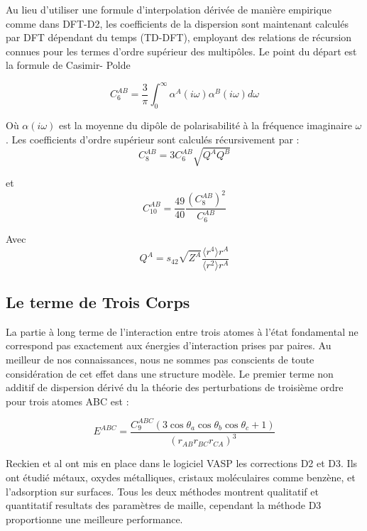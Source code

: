 	
	Au lieu d'utiliser une formule d'interpolation dérivée de manière empirique comme dans DFT-D2, les coefficients de la dispersion sont maintenant calculés par DFT dépendant du temps (TD-DFT), employant des relations de récursion connues pour les termes d'ordre supérieur des multipôles. Le point du départ est la formule de Casimir- Polde\cite{kaplan2006intermolecular} 
	
	\bigskip
	\begin{equation}
	C_{6}^{AB} = \frac{3}{\pi}\int_{0}^{\infty} \alpha^{A} (i\omega) \alpha^{B} (i\omega) d\omega
	\end{equation}
	\bigskip
	
	Où $\alpha(i\omega)$ est la moyenne du dipôle de polarisabilité à la fréquence imaginaire $\omega$. Les coefficients d'ordre supérieur sont calculés récursivement par :
	\bigskip
	\begin{equation}
	C_{8}^{AB} = 3C_{6}^{AB} \sqrt{Q^{A}Q^{B}}
	\end{equation}
	
	et \begin{equation}
	C_{10}^{AB} =\frac{49}{40} \frac{(C_{8}^{AB})^{2}}{C_{6}^{AB}}
	\end{equation}
	
	Avec
	\begin{equation}
	Q^{A} = s_{42}\sqrt{Z^{A}} \frac{\langle r^{4}\rangle r^{A}}{\langle r^{2}\rangle r^{A}}
	\end{equation}
	
	\bigskip
	\subsection{Le terme de Trois Corps}
	\bigskip
	
	La partie à long terme de l'interaction entre trois atomes à l'état fondamental ne correspond pas exactement aux énergies d'interaction prises par paires. Au meilleur de nos connaissances, nous ne sommes pas conscients de toute considération de cet effet dans une structure modèle. Le premier terme non additif de dispersion dérivé du
	la théorie des perturbations de troisième ordre pour trois atomes ABC est :
	
	\begin{equation}
	E^{ABC} = \frac{C_{9}^{ABC}(3\cos\theta_{a}\cos\theta_{b}\cos\theta_{c}+ 1)}{(r_{AB} r_{BC} r_{CA})^{3}}
	\end{equation}
	
	
	Reckien et al \cite{reckien2012implementation} ont mis en place dans le logiciel VASP les corrections D2 et D3. Ils ont étudié métaux, oxydes métalliques, cristaux moléculaires comme benzène, et l'adsorption sur surfaces. Tous les deux méthodes montrent qualitatif et quantitatif resultats des paramètres de maille, cependant la méthode D3 proportionne une meilleure performance.   
	
